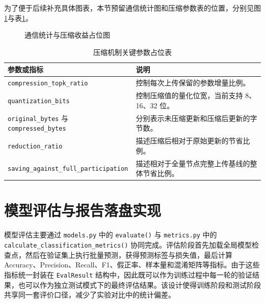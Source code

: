 为了便于后续补充具体图表，本节预留通信统计图和压缩参数表的位置，分别见图\ref{fig:communication-placeholder}与表\ref{tab:compression-placeholder}。

\begin{figure}[htbp]
    \centering
    \caption{通信统计与压缩收益占位图}
    \label{fig:communication-placeholder}
\end{figure}

\begin{table}[htbp]
    \centering
    \caption{压缩机制关键参数占位表}
    \label{tab:compression-placeholder}
    \begin{tabular}{p{3.6cm}p{8.6cm}}
        \toprule
        参数或指标 & 说明 \\
        \midrule
        \texttt{compression\_topk\_ratio} & 控制每次上传保留的参数增量比例。 \\
        \texttt{quantization\_bits} & 控制压缩值的量化位宽，当前支持 8、16、32 位。 \\
        \texttt{original\_bytes} 与 \texttt{compressed\_bytes} & 分别表示未压缩更新和压缩后更新的字节数。 \\
        \texttt{reduction\_ratio} & 描述压缩后相对于原始更新的节省比例。 \\
        \texttt{saving\_against\_full\_participation} & 描述相对于全量节点完整上传基线的整体节省比例。 \\
        \bottomrule
    \end{tabular}
\end{table}

\section{模型评估与报告落盘实现}
\label{sec:implementation-evaluation}

模型评估主要通过 \texttt{models.py} 中的 \texttt{evaluate()} 与 \texttt{metrics.py} 中的 \texttt{calculate\_classification\_metrics()} 协同完成。评估阶段首先加载全局模型检查点，然后在验证集上执行批量预测，获得预测标签与损失值，最后计算 Accuracy、Precision、Recall、F1、假正率、样本量和混淆矩阵等指标。由于这些指标统一封装在 \texttt{EvalResult} 结构中，因此既可以作为训练过程中每一轮的验证结果，也可以作为独立测试模式下的最终评估结果。该设计使得训练阶段和测试阶段共享同一套评价口径，减少了实验对比中的统计偏差。

